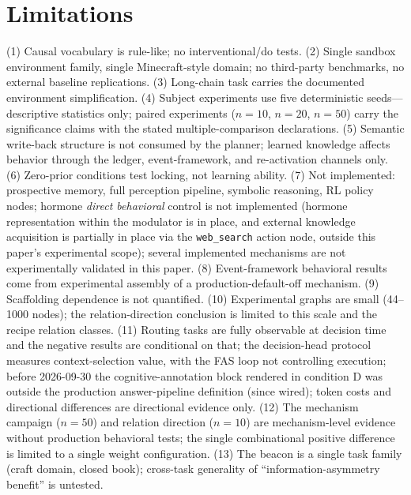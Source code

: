 \documentclass[10pt,a4paper]{article}
\begin{document}
\section{Limitations}
\label{sec:limits}
(1) Causal vocabulary is rule-like; no interventional/do tests. (2) Single sandbox environment family, single Minecraft-style domain; no third-party benchmarks, no external baseline replications. (3) Long-chain task carries the documented environment simplification. (4) Subject experiments use five deterministic seeds---descriptive statistics only; paired experiments ($n{=}10$, $n{=}20$, $n{=}50$) carry the significance claims with the stated multiple-comparison declarations. (5) Semantic write-back structure is not consumed by the planner; learned knowledge affects behavior through the ledger, event-framework, and re-activation channels only. (6) Zero-prior conditions test locking, not learning ability. (7) Not implemented: prospective memory, full perception pipeline, symbolic reasoning, RL policy nodes; hormone \emph{direct behavioral} control is not implemented (hormone representation within the modulator is in place, and external knowledge acquisition is partially in place via the \texttt{web\_search} action node, outside this paper's experimental scope); several implemented mechanisms are not experimentally validated in this paper. (8) Event-framework behavioral results come from experimental assembly of a production-default-off mechanism. (9) Scaffolding dependence is not quantified. (10) Experimental graphs are small (44--1000 nodes); the relation-direction conclusion is limited to this scale and the recipe relation classes. (11) Routing tasks are fully observable at decision time and the negative results are conditional on that; the decision-head protocol measures context-selection value, with the FAS loop not controlling execution; before 2026-09-30 the cognitive-annotation block rendered in condition D was outside the production answer-pipeline definition (since wired); token costs and directional differences are directional evidence only. (12) The mechanism campaign ($n{=}50$) and relation direction ($n{=}10$) are mechanism-level evidence without production behavioral tests; the single combinational positive difference is limited to a single weight configuration. (13) The beacon is a single task family (craft domain, closed book); cross-task generality of ``information-asymmetry benefit'' is untested.
\end{document}
